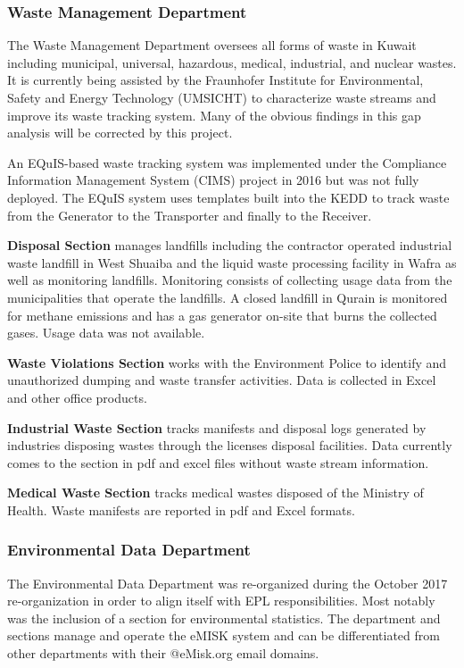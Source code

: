 \subsubsection{Waste Management Department}
The Waste Management Department oversees all forms of waste in Kuwait including municipal, universal, hazardous, medical, industrial, and nuclear wastes. It is currently being assisted by the  Fraunhofer Institute for Environmental, Safety and Energy Technology (UMSICHT) to characterize waste streams and improve its waste tracking system. Many of the obvious findings in this gap analysis will be corrected by this project.

An EQuIS-based waste tracking system was implemented under the Compliance Information Management System (CIMS) project in 2016 but was not fully deployed. The EQuIS system uses templates built into the KEDD to track waste from the Generator to the Transporter and finally to the Receiver.

\textbf{Disposal Section} manages landfills including the contractor operated industrial waste landfill in West Shuaiba and the liquid waste processing facility in Wafra as well as monitoring landfills. Monitoring consists of collecting usage data from the municipalities that operate the landfills. A closed landfill in Qurain is monitored for methane emissions and has a gas generator on-site that burns the collected gases. Usage data was not available.

\textbf{Waste Violations Section} works with the Environment Police to identify and unauthorized dumping and waste transfer activities. Data is collected in Excel and other office products.

\textbf{Industrial Waste Section} tracks manifests and disposal logs generated by industries disposing wastes through the licenses disposal facilities. Data currently comes to the section in pdf and excel files without waste stream information.

\textbf{Medical Waste Section} tracks medical wastes disposed of the Ministry of Health. Waste manifests are reported in pdf and Excel formats.

\subsubsection{Environmental Data Department}
The Environmental Data Department was re-organized during the October 2017 re-organization in order to align itself with EPL responsibilities. Most notably was the inclusion of a section for environmental statistics. The department and sections manage and operate the  eMISK system and can be differentiated from other departments with their @eMisk.org email domains.  

